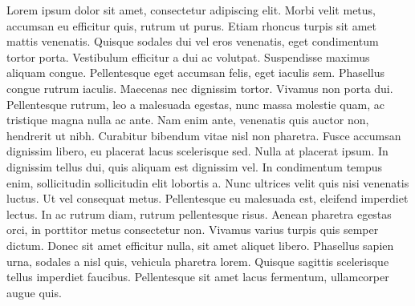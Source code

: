
Lorem ipsum dolor sit amet, consectetur adipiscing elit. Morbi velit metus, accumsan eu efficitur quis, rutrum ut purus. Etiam rhoncus turpis sit amet mattis venenatis. Quisque sodales dui vel eros venenatis, eget condimentum tortor porta. Vestibulum efficitur a dui ac volutpat. Suspendisse maximus aliquam congue. Pellentesque eget accumsan felis, eget iaculis sem. Phasellus congue rutrum iaculis. Maecenas nec dignissim tortor. Vivamus non porta dui. Pellentesque rutrum, leo a malesuada egestas, nunc massa molestie quam, ac tristique magna nulla ac ante. Nam enim ante, venenatis quis auctor non, hendrerit ut nibh. Curabitur bibendum vitae nisl non pharetra. Fusce accumsan dignissim libero, eu placerat lacus scelerisque sed. Nulla at placerat ipsum. In dignissim tellus dui, quis aliquam est dignissim vel. In condimentum tempus enim, sollicitudin sollicitudin elit lobortis a. Nunc ultrices velit quis nisi venenatis luctus. Ut vel consequat metus. Pellentesque eu malesuada est, eleifend imperdiet lectus. In ac rutrum diam, rutrum pellentesque risus. Aenean pharetra egestas orci, in porttitor metus consectetur non. Vivamus varius turpis quis semper dictum. Donec sit amet efficitur nulla, sit amet aliquet libero. Phasellus sapien urna, sodales a nisl quis, vehicula pharetra lorem. Quisque sagittis scelerisque tellus imperdiet faucibus. Pellentesque sit amet lacus fermentum, ullamcorper augue quis. 